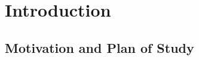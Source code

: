\documentclass[11pt]{book}
\begin{document}

\tableofcontents \markright{ }
\listoffigures \markright{ }
\listofalgorithms \markright { }
\lstlistoflistings \markright{ }

\clearpage
{} \setcounter{page}{1}


\chapter{Introduction}\label{intro} 







\section{Motivation and Plan of Study}
\end{document}
